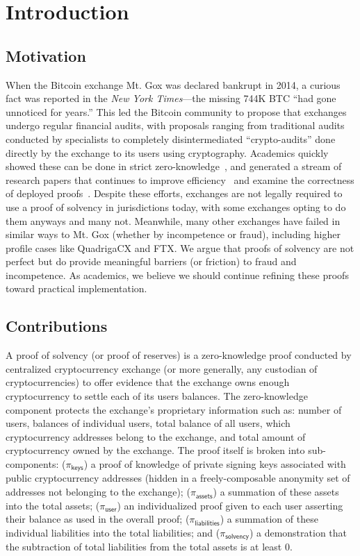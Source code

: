 \chapter{Introduction}

\section{Motivation}

When the Bitcoin exchange Mt. Gox was declared bankrupt in 2014, a curious fact was reported in the \textit{New York Times}---the missing 744K BTC ``had gone unnoticed for years.'' This led the Bitcoin community to propose that exchanges undergo regular financial audits, with proposals ranging from traditional audits conducted by specialists to completely disintermediated ``crypto-audits'' done directly by the exchange to its users using cryptography. Academics quickly showed these can be done in strict zero-knowledge~\cite{provisions}, and generated a stream of research papers that continues to improve efficiency~\cite{bulletproofs,zeroledge,dapol,spp,notus,izpr} and examine the correctness of deployed proofs~\cite{broken}. Despite these efforts, exchanges are not legally required to use a proof of solvency in jurisdictions today, with some exchanges opting to do them anyways and many not. Meanwhile, many other exchanges have failed in similar ways to Mt. Gox (whether by incompetence or fraud), including higher profile cases like QuadrigaCX and FTX. We argue that proofs of solvency are not perfect but do provide meaningful barriers (or friction) to fraud and incompetence. As academics, we believe we should continue refining these proofs toward practical implementation.  


\section{Contributions}

A proof of solvency (or proof of reserves) is a zero-knowledge proof conducted by centralized cryptocurrency exchange (or more generally, any custodian of cryptocurrencies) to offer evidence that the exchange owns enough cryptocurrency to settle each of its users balances. The zero-knowledge component protects the exchange's proprietary information such as: number of users, balances of individual users, total balance of all users, which cryptocurrency addresses belong to the exchange, and total amount of cryptocurrency owned by the exchange. The proof itself is broken into sub-components: ($\pi_\mathsf{keys}$) a proof of knowledge of private signing keys associated with public cryptocurrency addresses (hidden in a freely-composable anonymity set of addresses not belonging to the exchange); ($\pi_\mathsf{assets}$) a summation of these assets into the total assets; ($\pi_\mathsf{user}$) an individualized proof given to each user asserting their balance as used in the overall proof; ($\pi_\mathsf{liabilities}$) a summation of these individual liabilities into the total liabilities; and ($\pi_\mathsf{solvency}$) a demonstration that the subtraction of total liabilities from the total assets is at least 0.

